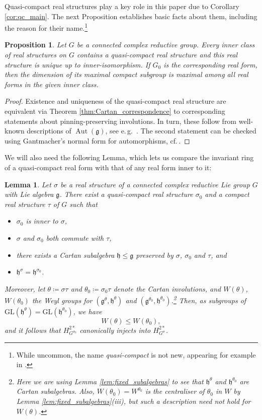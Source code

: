 \documentclass{amsart}
\newcommand{\eg}{e.\,g.}
\newcommand{\cf}{cf.\,}
\newcommand{\Aut}{\operatorname{Aut}}
\newcommand{\g}{\mathfrak{g}}
\newcommand{\GL}{\mathrm{GL}}
\newcommand{\h}{\mathfrak{h}}
\theoremstyle{definition}
\theoremstyle{plain}
\newtheorem{prop}[defn]{Proposition}
\newtheorem{lem}[defn]{Lemma}
\theoremstyle{remark}
\begin{document}
Quasi-compact real structures play a key role in this paper due to Corollary \ref{cor:qc_main}. The next Proposition establishes basic facts about them, including the reason for their name.\footnote{While uncommon, the name \emph{quasi-compact} is not new, appearing for example in \cite[Rmk.\,8.3]{AT_2018_Galois_and_Cartan}.}
\begin{prop}
\label{prop:qc_funfacts}
    Let $G$ be a connected complex reductive group. Every inner class of real structures on $G$ contains a quasi-compact real structure and this real structure is unique up to inner-isomorphism. If $G_0$ is the corresponding real form, then the dimension of its maximal compact subgroup is maximal among all real forms in the given inner class.
\end{prop}
\begin{proof}
    Existence and uniqueness of the quasi-compact real structure are equivalent via Theorem \ref{thm:Cartan_correspondence} to corresponding statements about pinning-preserving involutions. In turn, these follow from well-known descriptions of $\Aut(\g)$, see \eg\ \cite[ch.\,4]{Onishchik2004_real}. The second statement can be checked using Gantmacher's normal form for automorphisms, \cf \cite[Thm.\,4.2]{Onishchik2004_real}.
\end{proof}
We will also need the following Lemma, which lets us compare the invariant ring of a quasi-compact real form with that of any real form inner to it:
\begin{lem}
\label{lem:comparison_map}
    Let $\sigma$ be a real structure of a connected complex reductive Lie group $G$ with Lie algebra $\g$. There exist a quasi-compact real structure $\sigma_0$ and a compact real structure $\tau$ of $G$ such that
    \begin{itemize}
        \item $\sigma_0$ is inner to $\sigma$,
        \item $\sigma$ and $\sigma_0$ both commute with $\tau$,
        \item there exists a Cartan subalgebra $\h\le \g$ preserved by $\sigma$, $\sigma_0$ and $\tau$, and
        \item $\h^\sigma = \h^{\sigma_0}$.
    \end{itemize}
    Moreover, let $\theta\coloneqq \sigma\tau$ and $\theta_0\coloneqq \sigma_0\tau$ denote the Cartan involutions, and $W(\theta)$, $W(\theta_0)$ the Weyl groups for $(\g^\theta, \h^\theta)$ and $(\g^{\theta_0}, \h^{\theta_0})$.\footnote{Here we are using Lemma \ref{lem:fixed_subalgebras} to see that $\h^\theta$ and $\h^{\theta_0}$ are Cartan subalgebras. Also, $W(\theta_0) = W^{\theta_0}$ is the centraliser of $\theta_0$ in $W$ by Lemma \ref{lem:fixed_subalgebras}(iii), but such a description need not hold for $W(\theta)$.} Then, as subgroups of $\GL(\h^\theta) = \GL(\h^{\theta_0})$, we have
    $$
        W(\theta) \le W(\theta_0),
    $$
    and it follows that $H^{2*}_{G^{\sigma_0}}$ canonically injects into $H^{2*}_{G^\sigma}$.
\end{lem}
\end{document}
